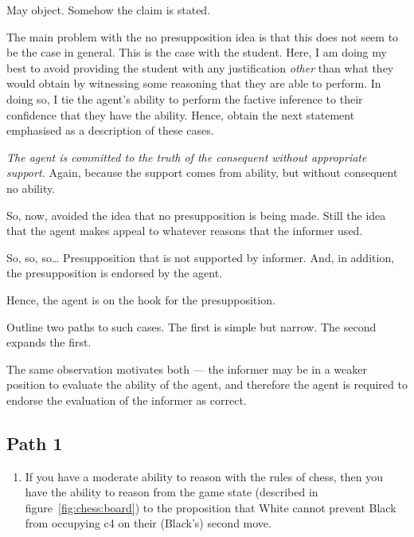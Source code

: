 \documentclass[10pt]{article}
\begin{document}
\begin{note}
  May object.
  Somehow the claim is stated.

  The main problem with the no presupposition idea is that this does not seem to be the case in general.
  This is the case with the student.
  Here, I am doing my best to avoid providing the student with any justification \emph{other} than what they would obtain by witnessing some reasoning that they are able to perform.
  In doing so, I tie the agent's ability to perform the factive inference to their confidence that they have the ability.
  Hence, obtain the next statement emphasised as a description of these cases.
\end{note}

\emph{The agent is committed to the truth of the consequent without appropriate support.}
Again, because the support comes from ability, but without consequent no ability.

\begin{note}
  So, now, avoided the idea that no presupposition is being made.
  Still the idea that the agent makes appeal to whatever reasons that the informer used.

  So, so, so\dots
  Presupposition that is not supported by informer.
  And, in addition, the presupposition is endorsed by the agent.

  Hence, the agent is on the hook for the presupposition.
\end{note}

Outline two paths to such cases.
The first is simple but narrow.
The second expands the first.

The same observation motivates both --- the informer may be in a weaker position to evaluate the ability of the agent, and therefore the agent is required to endorse the evaluation of the informer as correct.

\subsection{Path 1}
\label{sec:path-1}

\begin{enumerate}
\item\label{chess:claim:1:conditional} If you have a moderate ability to reason with the rules of chess, then you have the ability to reason from the game state (described in figure~\ref{fig:chess:board}) to the proposition that White cannot prevent Black from occupying c4 on their (Black's) second move.
\end{enumerate}
\end{document}
